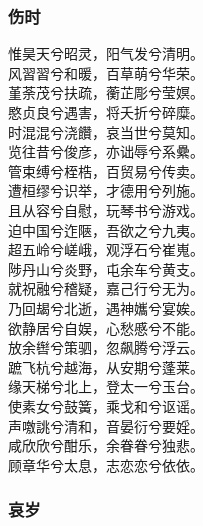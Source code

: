 \documentclass[]{article}
\begin{document}
\hypertarget{header-n400}{%
\subsubsection{伤时}\label{header-n400}}

惟昊天兮昭灵，阳气发兮清明。\\
风習習兮和暖，百草萌兮华荣。\\
堇荼茂兮扶疏，蘅芷彫兮莹嫇。\\
愍贞良兮遇害，将夭折兮碎糜。\\
时混混兮浇饡，哀当世兮莫知。\\
览往昔兮俊彦，亦诎辱兮系纍。\\
管束缚兮桎梏，百贸易兮传卖。\\
遭桓缪兮识举，才德用兮列施。\\
且从容兮自慰，玩琴书兮游戏。\\
迫中国兮迮陿，吾欲之兮九夷。\\
超五岭兮嵯峨，观浮石兮崔嵬。\\
陟丹山兮炎野，屯余车兮黄支。\\
就祝融兮稽疑，嘉己行兮无为。\\
乃回朅兮北逝，遇神孈兮宴娭。\\
欲静居兮自娱，心愁慼兮不能。\\
放余辔兮策驷，忽飙腾兮浮云。\\
蹠飞杭兮越海，从安期兮蓬莱。\\
缘天梯兮北上，登太一兮玉台。\\
使素女兮鼓簧，乘戈和兮讴谣。\\
声噭誂兮清和，音晏衍兮要婬。\\
咸欣欣兮酣乐，余眷眷兮独悲。\\
顾章华兮太息，志恋恋兮依依。

\hypertarget{header-n405}{%
\subsubsection{哀岁}\label{header-n405}}
\end{document}
